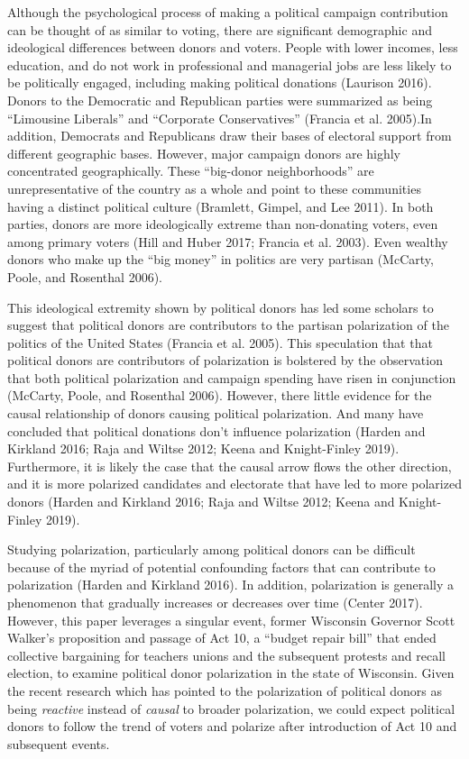 \documentclass[12pt,]{article}
\begin{document}
Although the psychological process of making a political campaign
contribution can be thought of as similar to voting, there are
significant demographic and ideological differences between donors and
voters. People with lower incomes, less education, and do not work in
professional and managerial jobs are less likely to be politically
engaged, including making political donations (Laurison 2016). Donors to
the Democratic and Republican parties were summarized as being
``Limousine Liberals'' and ``Corporate Conservatives'' (Francia et al.
2005).In addition, Democrats and Republicans draw their bases of
electoral support from different geographic bases. However, major
campaign donors are highly concentrated geographically. These
``big-donor neighborhoods'' are unrepresentative of the country as a
whole and point to these communities having a distinct political culture
(Bramlett, Gimpel, and Lee 2011). In both parties, donors are more
ideologically extreme than non-donating voters, even among primary
voters (Hill and Huber 2017; Francia et al. 2003). Even wealthy donors
who make up the ``big money'' in politics are very partisan (McCarty,
Poole, and Rosenthal 2006).

This ideological extremity shown by political donors has led some
scholars to suggest that political donors are contributors to the
partisan polarization of the politics of the United States (Francia et
al. 2005). This speculation that that political donors are contributors
of polarization is bolstered by the observation that both political
polarization and campaign spending have risen in conjunction (McCarty,
Poole, and Rosenthal 2006). However, there little evidence for the
causal relationship of donors causing political polarization. And many
have concluded that political donations don't influence polarization
(Harden and Kirkland 2016; Raja and Wiltse 2012; Keena and Knight-Finley
2019). Furthermore, it is likely the case that the causal arrow flows
the other direction, and it is more polarized candidates and electorate
that have led to more polarized donors (Harden and Kirkland 2016; Raja
and Wiltse 2012; Keena and Knight-Finley 2019).

Studying polarization, particularly among political donors can be
difficult because of the myriad of potential confounding factors that
can contribute to polarization (Harden and Kirkland 2016). In addition,
polarization is generally a phenomenon that gradually increases or
decreases over time (Center 2017). However, this paper leverages a
singular event, former Wisconsin Governor Scott Walker's proposition and
passage of Act 10, a ``budget repair bill'' that ended collective
bargaining for teachers unions and the subsequent protests and recall
election, to examine political donor polarization in the state of
Wisconsin. Given the recent research which has pointed to the
polarization of political donors as being \emph{reactive} instead of
\emph{causal} to broader polarization, we could expect political donors
to follow the trend of voters and polarize after introduction of Act 10
and subsequent events.
\end{document}
